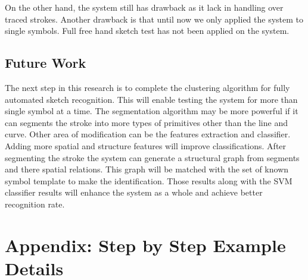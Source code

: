  On the other hand, the system still has drawback as it lack in handling over traced strokes.  Another drawback is that until now we only applied the system to single symbols.  Full free hand sketch test has not been applied on the system. %

\newpage

\section{Future Work}
\label{sec:FutureWork}


The next step in this research is to complete the clustering algorithm for fully automated sketch recognition. This will enable testing the system for more than single symbol at a time. The segmentation algorithm may be more powerful if it can segments the stroke into more types of primitives other than the line and curve. Other area of modification can be the features extraction and classifier. Adding more spatial and structure features will improve classifications. After segmenting the stroke the system can generate a structural graph from segments and there spatial relations. This graph will be matched with the set of known symbol template to make the identification. Those results along with the SVM classifier results will enhance the system as a whole and achieve better recognition rate.  %
\appendix
\chapter{Appendix: Step by Step Example Details}
\label{ChapterstepExample}%

